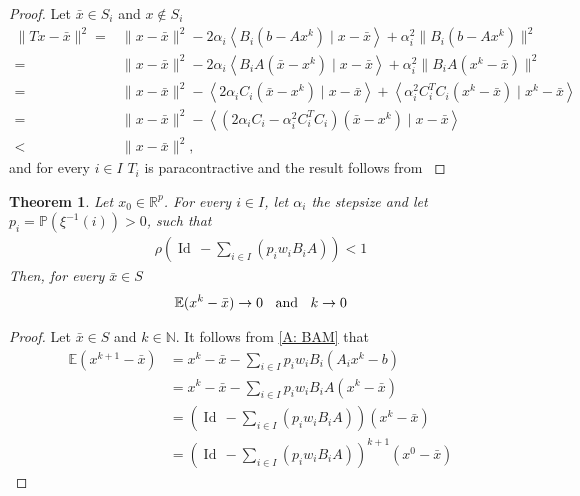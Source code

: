 \documentclass[11pt]{report}
\newcommand{\scal}[2]{{\left\langle{{#1}\mid{#2}}\right\rangle}}
\newcommand{\Id}{\ensuremath{\operatorname{Id}}\,}
\newcommand{\RR}{\ensuremath{\mathbb{R}}}
\newcommand{\NN}{\ensuremath{\mathbb N}}
\newtheorem{theorem}{Theorem}[chapter]
\theoremstyle{plain}{\theorembodyfont{\rmfamily}%
\newtheorem{assumption}[theorem]{Assumption}}
\theoremstyle{plain}{\theorembodyfont{\rmfamily}%
\newtheorem{algorithm}[theorem]{Algorithm}}
\theoremstyle{plain}{\theorembodyfont{\rmfamily}%
\newtheorem{example}[theorem]{Example}}
\theoremstyle{plain}{\theorembodyfont{\rmfamily}%
\newtheorem{remark}[theorem]{Remark}}
\theoremstyle{plain}{\theorembodyfont{\rmfamily}%
\newtheorem{definition}[theorem]{Definition}}
\theoremstyle{plain}{\theorembodyfont{\rmfamily}%
\newtheorem{problem}[theorem]{Problem}}
\numberwithin{equation}{chapter}
\begin{document}
\begin{proof}
  Let $\bar{x}\in S_i$ and $x\not\in S_i $
    \begin{align}
        \|Tx-\bar{x}\|^2=&\|x-\bar{x}\|^2-2\alpha_{i}\scal{B_{i}\left(b-Ax^k\right)}{x-\bar{x}}+\alpha_{i}^{2}\|B_{i}\left(b-Ax^k\right)\|^{2}\nonumber\\=&\|x-\bar{x}\|^2-2\alpha_{i}\scal{B_{i}A\left(\bar{x}-x^k\right)}{x-\bar{x}}+\alpha_{i}^{2}\|B_{i}A\left(x^k-\bar{x}\right)\|^{2}\nonumber\\=&\|x-\bar{x}\|^2-\scal{2\alpha_{i}C_i\left(\bar{x}-x^k\right)}{x-\bar{x}}+\scal{\alpha_{i}^{2}C^{T}_{i}C_i\left(x^k-\bar{x}\right)}{x^k-\bar{x}}\nonumber\\=&\|x-\bar{x}\|^2-\scal{(2\alpha_{i}C_i-\alpha^{2}_{i}C^{T}_{i}C_{i})\left(\bar{x}-x^k\right)}{x-\bar{x}}\nonumber\\<&\|x-\bar{x}\|^2,
    \end{align}
and for every $i\in I$  $T_i$ is paracontractive and the result follows from \cite[Theorem 3.6]{Russell}
\end{proof}
\begin{theorem}\label{T:Convergence1} Let $x_0\in\RR^{p}$. For every $i\in I$, let $\alpha_i$ the stepsize and  let $p_{i}=\mathbb{P}(\xi^{-1}(i))>0$, such that 
    \begin{align}
        \rho(\Id-\sum_{i\in I}(p_iw_iB_{i}A))<1
        \label{c: conditionlambda1}
    \end{align}
    Then, for every $\bar{x}\in S$ \begin{align}
        \mathbb{E}(x^{k}-\bar{x})\rightarrow 0\hspace{2mm}\text{ and }\hspace{2mm}k\rightarrow 0
    \end{align}
\end{theorem} 
\begin{proof}
    Let $\bar{x}\in S$ and $k\in\NN$. It follows from \eqref{A: BAM} that
    \begin{align}
        \mathbb{E}(x^{k+1}-\bar{x})&=x^{k}-\bar{x}-\sum_{i\in I}p_{i}w_{i}B_i(A_ix^{k}-b)\nonumber\\&=x^{k}-\bar{x}-\sum_{i\in I}p_{i}w_{i}B_iA(x^{k}-\bar{x})\nonumber\\&=\left(\Id-\sum_{i\in I}(p_iw_iB_{i}A)\right)(x^{k}-\bar{x})\nonumber\\&=\left(\Id-\sum_{i\in I}(p_iw_iB_{i}A)\right)^{k+1}(x^{0}-\bar{x})
    \end{align}
\end{proof}
\end{document}
